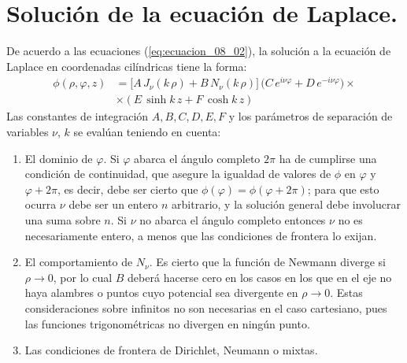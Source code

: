 \section{Solución de la ecuación de Laplace.}
De acuerdo a las ecuaciones (\ref{eq:ecuacion_08_02}), la solución a la ecuación de Laplace en coordenadas cilíndricas tiene la forma:
\begin{align*}
\phi (\rho, \varphi, z) &= \big[ A \, J_{\nu} (k \, \rho) + B \, N_{\nu} (k \, \rho) \big] \, (C \, e^{i \nu \varphi} + D \, e^{-i \nu \varphi} \big) \times \\[0.5em]
&\times (E \, \sinh k \, z + F \,  \cosh k \, z)  \end{align*}
Las constantes de integración $A, B, C, D, E, F$ y los parámetros de separación de variables $\nu$, $k$ se evalúan teniendo en cuenta:
\begin{enumerate}[label=\textbf{\Alph*})]
\item El dominio de $\varphi$. Si $\varphi$ abarca el ángulo completo $2 \pi$ ha de cumplirse una condición de continuidad, que asegure la igualdad de valores de $\phi$ en $\varphi$ y $\varphi + 2 \pi$, es decir, debe ser cierto que $\phi (\varphi) = \phi (\varphi + 2 \pi)$; para que esto ocurra $\nu$ debe ser un entero $n$ arbitrario, y la solución general debe involucrar una suma sobre $n$. Si $\nu$ no abarca el ángulo completo entonces $\nu$ no es necesariamente entero, a menos que las condiciones de frontera lo exijan.
\item El comportamiento de $N_{\nu}$. Es cierto que la función de Newmann diverge si $\rho \to 0$, por lo cual $B$ deberá hacerse cero en los casos en los que en el eje no haya alambres o puntos cuyo potencial sea divergente en $\rho \to 0$. Estas consideraciones sobre infinitos no son necesarias en el caso cartesiano, pues las funciones trigonométricas no divergen en ningún punto.
\item Las condiciones de frontera de Dirichlet, Neumann o mixtas.
\end{enumerate}
